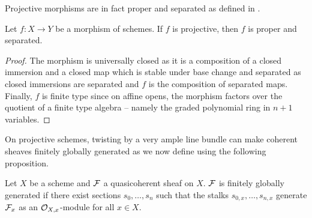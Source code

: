 Projective morphisms are in fact proper and separated as defined in . 
\begin{proposition}\label{prop: projective implies proper and separated}
    Let $f:X\to Y$ be a morphism of schemes. If $f$ is projective, then $f$ is proper and separated. 
\end{proposition}
\begin{proof}
    The morphism is universally closed as it is a composition of a closed immersion and a closed map which is stable under base change and separated as closed immersions are separated and $f$ is the composition of separated maps. Finally, $f$ is finite type since on affine opens, the morphism factors over the quotient of a finite type algebra -- namely the graded polynomial ring in $n+1$ variables. 
\end{proof}
On projective schemes, twisting by a very ample line bundle can make coherent sheaves finitely globally generated as we now define using the following proposition. 
\begin{definition}\label{def: finitely globally generated}
    Let $X$ be a scheme and $\mathcal{F}$ a quasicoherent sheaf on $X$. $\mathcal{F}$ is finitely globally generated if there exist sections $s_{0},\dots,s_{n}$ such that the stalks $s_{0,x},\dots,s_{n,x}$ generate $\mathcal{F}_{x}$ as an $\mathcal{O}_{X,x}$-module for all $x\in X$. 
\end{definition}